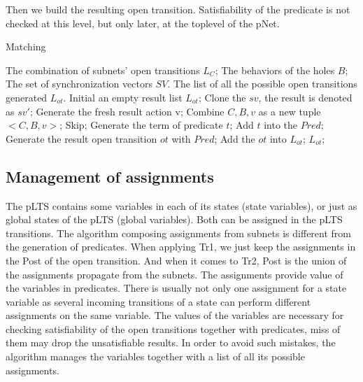 \documentclass{lncs/llncs}
\begin{document}
Then we build the resulting open transition. Satisfiability of the
predicate is not checked at this level, but only later, at the
toplevel of the pNet.

\begin{algorithm}
\caption{Matching}
\begin{algorithmic}[1]

\Require 
The combination of subnets' open transitions $L_C$;
The behaviors of the holes $B$;
The set of synchronization vectors $SV$.
\Ensure 
The list of all the possible open transitions generated $L_{ot}$.
\State Initial an empty result list $L_{ot}$;
		\State Clone the $sv$, the result is denoted as $sv'$;
		\State Generate the fresh result action v;
		\State Combine $C, B, v$ as a new tuple $<C, B, v>$;
			\State Skip;
			\Else 
			\State Generate the term of predicate $t$;
			\State Add $t$ into the $Pred$;
			\EndIf
		\EndFor
		\State Generate the result open transition $ot$ with $Pred$;
		\State Add the $ot$ into $L_{ot}$;
	\EndFor
\EndFor 
\State \Return $L_{ot}$;

\end{algorithmic} 
\end{algorithm}

\subsection{Management of assignments}
The pLTS contains some variables in each of its states (state
variables), or just as global states of the pLTS (global variables).
Both can be assigned in the pLTS transitions.
The algorithm composing assignments from subnets is different from the
generation of predicates. When applying Tr1, we just keep the
assignments in the Post of the open transition. And when it comes to
Tr2, Post is the union of the assignments propagate from the
subnets. The assignments provide value of the variables in
predicates.
There is usually not only one assignment for a state variable as
several incoming transitions of a state can perform different
assignments on the same variable. The values of the
variables are necessary for checking satisfiability of the open
transitions together with predicates, miss of them may drop the
unsatisfiable results. In order to avoid such mistakes, the algorithm
manages the variables together with a list of all its possible assignments.
\end{document}
